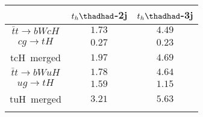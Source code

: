 \centering
\begin{tabular}{ccc} \toprule\toprule
 & $t_{h}\thadhad$-2j& $t_{h}\thadhad$-3j\\\midrule
$\bar{t}t\to bWcH$ & $1.73$   & $4.49$   \\
$cg\to tH$         & $0.27$   & $0.23$   \\
tcH~merged         & $1.97$   & $4.69$   \\
$\bar{t}t\to bWuH$ & $1.78$   & $4.64$   \\
$ug\to tH$         & $1.59$   & $1.15$   \\
tuH~merged         & $3.21$   & $5.63$   \\
\bottomrule\bottomrule\\
\end{tabular}


